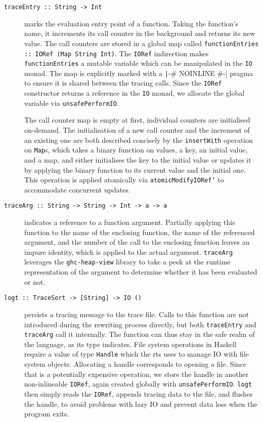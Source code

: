 \documentclass[thesis=B,english]{FITthesis}[2019/12/23]
\newcommand{\hackage}[1]{\texttt{#1}}
\newcommand{\hsType}[1]{\texttt{#1}}
\newcommand{\hsIdent}[1]{\texttt{#1}}
\newcommand{\hsCode}[1]{\texttt{#1}}
\begin{document}
\begin{description}
	\item[\hsCode{traceEntry :: String -> Int}] marks the evaluation entry
		point of a function. Taking the function's name, it increments its call
		counter in the background and returns its new value. The call counters
		are stored in a global map called \hsCode{functionEntries :: IORef (Map
		String Int)}. The \hsType{IORef} indirection makes
		\hsIdent{functionEntries} a mutable variable which can be manipulated
		in the \hsType{IO} monad. The map is explicitly marked with a
		\texttt|{-# NOINLINE #-}|
		pragma to ensure it is shared between the tracing calls. Since the
		\hsType{IORef} constructor returns a reference in the \hsType{IO}
		monad, we allocate the global variable via \hsIdent{unsafePerformIO}.

		The call counter map is empty at first, individual counters are
		initialised on-demand. The initialisation of a new call counter and the
		increment of an existing one are both described concisely by the
		\hsIdent{insertWith} operation on \hsType{Map}s, which takes a binary
		function on values, a key, an initial value, and a map, and either
		initialises the key to the initial value or updates it by applying the
		binary function to its current value and the initial one. This
		operation is applied atomically via \hsIdent{atomicModifyIORef'} to
		accommodate concurrent updates.

	\item[\hsCode{traceArg :: String -> String -> Int -> a -> a}] indicates a
		reference to a function argument. Partially applying this function to
		the name of the enclosing function, the name of the referenced
		argument, and the number of the call to the enclosing function leaves
		an impure identity, which is applied to the actual argument.
		\hsIdent{traceArg} leverages the \hackage{ghc-heap-view} library to
		take a peek at the runtime representation of the argument to determine
		whether it has been evaluated or not.

	\item[\hsCode{logt :: TraceSort -> [String] -> IO ()}] persists a tracing
		message to the trace file. Calls to this function are not introduced
		during the rewriting process directly, but both \hsIdent{traceEntry}
		and \hsIdent{traceArg} call it internally. The function can thus stay
		in the safe realm of the language, as its type indicates. File system
		operations in Haskell require a value of type \hsType{Handle} which the
		\acrshort{rts} uses to manage IO with file system objects. Allocating a
		handle corresponds to opening a file. Since that is a potentially
		expensive operation, we store the handle in another non-in\-line\-able
		\hsType{IORef}, again created globally with \hsIdent{unsafePerformIO}.
		\hsIdent{logt} then simply reads the \hsType{IORef}, appends tracing
		data to the file, and flushes the handle, to avoid problems with lazy
		IO and prevent data loss when the program exits.
\end{description}
\end{document}
